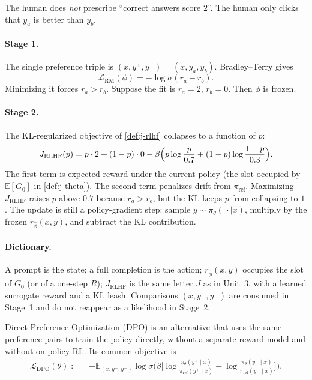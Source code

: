 \documentclass[11pt,a4paper]{article}
\theoremstyle{definition}
\begin{document}
\begin{example}
The human does \emph{not} prescribe ``correct answers score \(2\)''. The human only clicks that \(y_a\) is better than \(y_b\).

\paragraph{Stage 1.}
The single preference triple is \((x,y^+,y^-)=(x,y_a,y_b)\). Bradley--Terry gives
\[
\mathcal{L}_{\mathrm{RM}}(\phi)
=
-\log\sigma(r_a-r_b).
\]
Minimizing it forces \(r_a>r_b\). Suppose the fit is \(r_a=2\), \(r_b=0\). Then \(\phi\) is frozen.

\paragraph{Stage 2.}
The KL-regularized objective of \cref{def:j-rlhf} collapses to a function of \(p\):
\[
J_{\mathrm{RLHF}}(p)
=
p\cdot 2+(1-p)\cdot 0
-\beta\Bigl(
p\log\frac{p}{0.7}
+(1-p)\log\frac{1-p}{0.3}
\Bigr).
\]
The first term is expected reward under the current policy (the slot occupied by \(\mathbb{E}[G_0]\) in \cref{def:j-theta}). The second term penalizes drift from \(\pi_{\mathrm{ref}}\). Maximizing \(J_{\mathrm{RLHF}}\) raises \(p\) above \(0.7\) because \(r_a>r_b\), but the KL keeps \(p\) from collapsing to \(1\). The update is still a policy-gradient step: sample \(y\sim\pi_\theta(\,\cdot\mid x)\), multiply by the frozen \(r_{\widehat\phi}(x,y)\), and subtract the KL contribution.

\paragraph{Dictionary.}
A prompt is the state; a full completion is the action; \(r_{\widehat\phi}(x,y)\) occupies the slot of \(G_0\) (or of a one-step \(R\)); \(J_{\mathrm{RLHF}}\) is the same letter \(J\) as in Unit~3, with a learned surrogate reward and a KL leash. Comparisons \((x,y^+,y^-)\) are consumed in Stage~1 and do not reappear as a likelihood in Stage~2.
\end{example}

Direct Preference Optimization (DPO) is an alternative that uses the same preference
pairs to train the policy directly, without a separate reward model and without
on-policy RL. Its common objective is
\[
\begin{aligned}
\mathcal{L}_{\mathrm{DPO}}(\theta)
:={}&-\mathbb{E}_{(x,y^+,y^-)}
\log\sigma\Bigg(
\beta\Big[
\log\frac{\pi_\theta(y^+\mid x)}{\pi_{\mathrm{ref}}(y^+\mid x)}
-\log\frac{\pi_\theta(y^-\mid x)}{\pi_{\mathrm{ref}}(y^-\mid x)}
\Big]\Bigg).
\end{aligned}
\]
\end{document}
